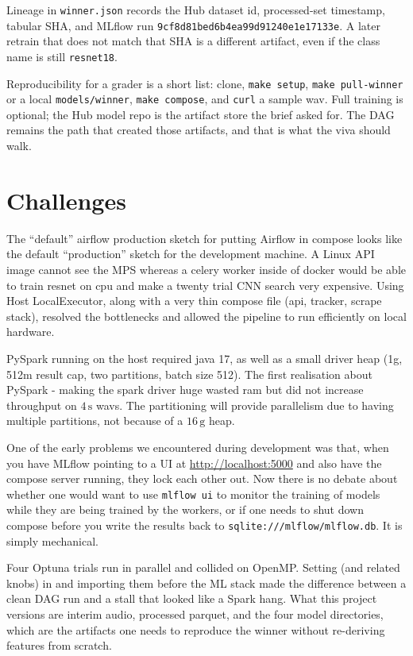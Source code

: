 \documentclass[conference]{IEEEtran}
\begin{document}
Lineage in \texttt{winner.json} records the Hub dataset id, processed-set timestamp, tabular SHA, and MLflow run \texttt{9cf8d81bed6b4ea99d91240e1e17133e}.
A later retrain that does not match that SHA is a different artifact, even if the class name is still \texttt{resnet18}.

Reproducibility for a grader is a short list: clone, \texttt{make setup}, \texttt{make pull-winner} or a local \texttt{models/winner}, \texttt{make compose}, and \texttt{curl} a sample wav.
Full training is optional; the Hub model repo is the artifact store the brief asked for.
The DAG remains the path that created those artifacts, and that is what the viva should walk.

\section{Challenges}
\label{sec:challenges}

The ``default'' airflow production sketch for putting Airflow in compose looks like the default ``production'' sketch for the development machine. A Linux API image cannot see the MPS whereas a celery worker inside of docker would be able to train resnet on cpu and make a twenty trial CNN search very expensive. Using Host LocalExecutor, along with a very thin compose file (api, tracker, scrape stack), resolved the bottlenecks and allowed the pipeline to run efficiently on local hardware.

PySpark running on the host required java 17, as well as a small driver heap (1g, 512m result cap, two partitions, batch size 512). The first realisation about PySpark - making the spark driver huge wasted ram but did not increase throughput on \(4\,\mathrm{s}\) wavs. The partitioning will provide parallelism due to having multiple partitions, not because of a \(16\,\mathrm{g}\) heap.

One of the early problems we encountered during development was that, when you have MLflow pointing to a UI at \url{http://localhost:5000} and also have the compose server running, they lock each other out. Now there is no debate about whether one would want to use \texttt{mlflow ui} to monitor the training of models while they are being trained by the workers, or if one needs to shut down compose before you write the results back to \texttt{sqlite:///mlflow/mlflow.db}. It is simply mechanical.

Four Optuna trials run in parallel and collided on OpenMP.
Setting  (and related knobs) in  and importing them before the ML stack made the difference between a clean DAG run and a stall that looked like a Spark hang.
What this project versions are interim audio, processed parquet, and the four model directories, which are the artifacts one needs to reproduce the winner without re-deriving features from scratch.
\end{document}
